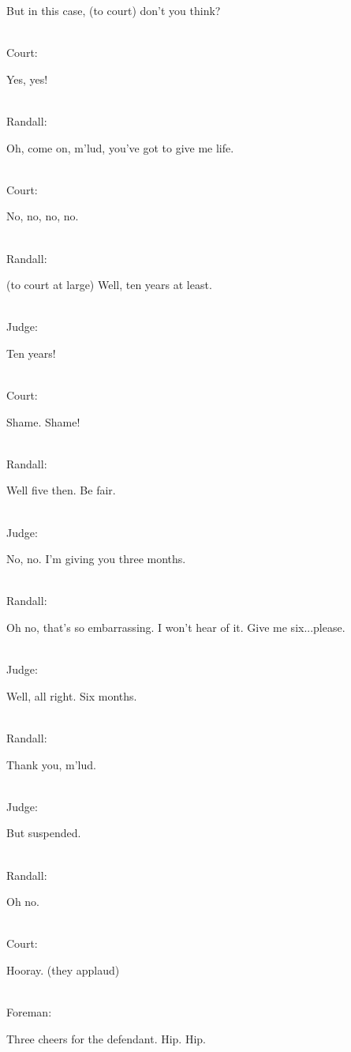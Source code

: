 \documentclass{report}
\begin{document}
But in this case, (to court) don't you think?

\noindent\\ Court: 	

Yes, yes!

\noindent\\ Randall: 	

Oh, come on, m'lud, you've got to give me life.

\noindent\\ Court: 	

No, no, no, no.

\noindent\\ Randall: 	

(to court at large) Well, ten years at least.

\noindent\\ Judge: 	

Ten years!

\noindent\\ Court: 	

Shame. Shame!

\noindent\\ Randall: 	

Well five then. Be fair.

\noindent\\ Judge: 	

No, no. I'm giving you three months.

\noindent\\ Randall: 	

Oh no, that's so embarrassing. I won't hear of it. Give me six...please.

\noindent\\ Judge: 	

Well, all right. Six months.

\noindent\\ Randall: 	

Thank you, m'lud.

\noindent\\ Judge: 	

But suspended.

\noindent\\  Randall: 	

Oh no.

\noindent\\ Court: 	

Hooray. (they applaud)

\noindent\\ Foreman: 	

Three cheers for the defendant. Hip. Hip.
\end{document}
